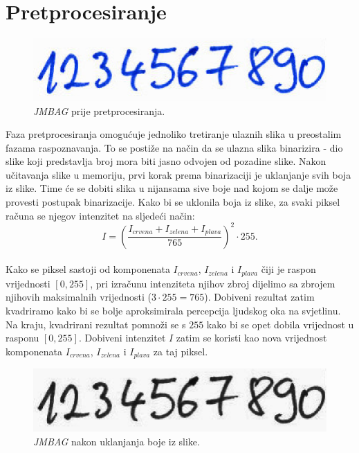 \section{Pretprocesiranje}
\label{sec:pretprocesiranje}
\begin{figure}[htb]
    \centering
    \includegraphics[width=12cm]{images/chapter4/preprocessing-original-image.png}
    \caption{\emph{JMBAG} prije pretprocesiranja.}
    \label{fig:preprocessing-original-image}
\end{figure}
Faza pretprocesiranja omogućuje jednoliko tretiranje ulaznih slika u preostalim fazama raspoznavanja. To se postiže na
način da se ulazna slika binarizira - dio slike koji predstavlja broj mora biti jasno odvojen od pozadine slike. Nakon
učitavanja slike u memoriju, prvi korak prema binarizaciji je uklanjanje svih boja iz slike. Time će se dobiti slika u
nijansama sive boje nad kojom se dalje može provesti postupak binarizacije. Kako bi se uklonila boja iz slike, za svaki
piksel računa se njegov intenzitet na sljedeći način:\\
\begin{equation*}
    I = \left(\frac{I_{crvena} + I_{zelena} + I_{plava}}{765}\right)^{2} \cdot 255.
\end{equation*}\\
Kako se piksel sastoji od komponenata $I_{crvena}$, $I_{zelena}$ i $I_{plava}$ čiji je raspon vrijednosti $[0, 255]$,
pri izračunu intenziteta njihov zbroj dijelimo sa zbrojem njihovih maksimalnih vrijednosti ($3 \cdot 255 = 765$).
Dobiveni rezultat zatim kvadriramo kako bi se bolje aproksimirala percepcija ljudskog oka na svjetlinu. Na kraju,
kvadrirani rezultat pomnoži se s $255$ kako bi se opet dobila vrijednost u rasponu $[0, 255]$. Dobiveni intenzitet $I$
zatim se koristi kao nova vrijednost komponenata $I_{crvena}$, $I_{zelena}$ i $I_{plava}$ za taj piksel.\\
\begin{figure}[htb]
    \centering
    \includegraphics[width=12cm]{images/chapter4/preprocessing-grayscale-image.png}
    \caption{\emph{JMBAG} nakon uklanjanja boje iz slike.}
    \label{fig:preprocessing-grayscale-image}
\end{figure}
